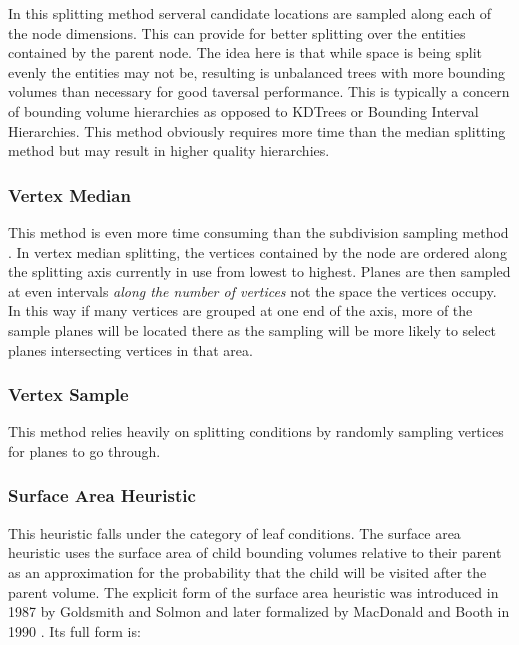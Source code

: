 \documentclass[12pt, a4paper]{article}
\begin{document}
In this splitting method serveral candidate locations are sampled along each of the node dimensions. This can provide for better splitting over the entities contained by the parent node. The idea here is that while space is being split evenly the entities may not be, resulting is unbalanced trees with more bounding volumes than necessary for good taversal performance. This is typically a concern of bounding volume hierarchies as opposed to KDTrees or Bounding Interval Hierarchies. This method obviously requires more time than the median splitting method but may result in higher quality hierarchies.

\subsubsection{Vertex Median}%

This method is even more time consuming than the subdivision sampling method . In vertex median splitting, the vertices contained by the node are ordered along the splitting axis currently in use from lowest to highest. Planes are then sampled at even intervals \textit{along the number of vertices} not the space the vertices occupy. In this way if many vertices are grouped at one end of the axis, more of the sample planes will be located there as the sampling will be more likely to select planes intersecting vertices in that area. 

\subsubsection{Vertex Sample}%

This method relies heavily on splitting conditions by randomly sampling vertices for planes to go through. 

\subsubsection{Surface Area Heuristic}%

This heuristic falls under the category of leaf conditions. The surface area heuristic uses the surface area of child bounding volumes relative to their parent as an approximation for the probability that the child will be visited after the parent volume. The explicit form of the surface area heuristic was introduced in 1987 by Goldsmith and Solmon \cite{goldsmith_1987} and later formalized by MacDonald and Booth in 1990 \cite{macdonald_1990}. Its full form is:
\end{document}
